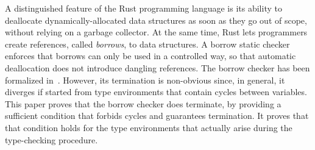 A distinguished feature of the Rust programming language
is its ability to deallocate dynamically-allocated
data structures as soon as they go out of scope, without relying on a garbage
collector. At the same time, Rust lets programmers create references,
called \emph{borrows}, to data structures. A borrow static checker enforces
that borrows can only be used in a controlled way, so that automatic deallocation
does not introduce dangling references.
The borrow checker has been formalized in~\cite{Pearce21}. However, its
termination is non-obvious since, in general, it diverges if started
from type environments that contain cycles between variables.
This paper proves that the borrow checker does terminate, by
providing a sufficient condition that forbids cycles
and guarantees termination. It proves
that that condition holds for the type environments
that actually arise during the type-checking procedure.
